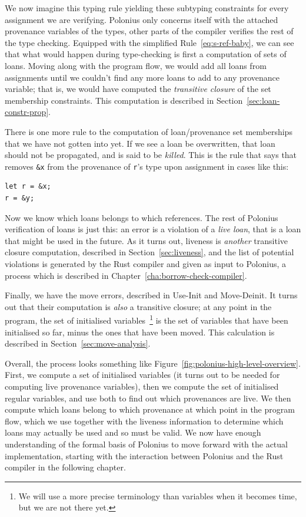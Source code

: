 \documentclass[11pt,a4paper,twoside,openany,draft]{report}
\newcommand{\InRust}[1]{\texttt{#1}}
\begin{document}
We now imagine this typing rule yielding these subtyping constraints for every
assignment we are verifying. Polonius only concerns itself with the attached
provenance variables of the types, other parts of the compiler verifies the rest
of the type checking. Equipped with the simplified Rule~\eqref{eq:s-ref-baby},
we can see that what would happen during type-checking is first a computation of
sets of loans. Moving along with the program flow, we would add all loans from
assignments until we couldn't find any more loans to add to any provenance
variable; that is, we would have computed the \textit{transitive closure} of the
set membership constraints. This computation is described in
Section~\ref{sec:loan-constr-prop}.

There is one more rule to the computation of loan/provenance set memberships
that we have not gotten into yet. If we see a loan be overwritten, that
loan should not be propagated, and is said to be \textit{killed}. This is the
rule that says that removes \InRust{&x} from the provenance of \InRust{r}'s type
upon assignment in cases like this:
\begin{verbatim}
let r = &x;
r = &y;
\end{verbatim}

Now we know which loans belongs to which references. The rest of Polonius
verification of loans is just this: an error is a violation of a \textit{live
  loan}, that is a loan that might be used in the future. As it turns out,
liveness is \textit{another} transitive closure computation, described in
Section~\ref{sec:liveness}, and the list of potential violations is generated by
the Rust compiler and given as input to Polonius, a process which is described
in Chapter~\ref{cha:borrow-check-compiler}.

Finally, we have the move errors, described in Use-Init and Move-Deinit. It
turns out that their computation is \textit{also} a transitive closure; at any
point in the program, the set of initialised variables~\footnote{We will use a
  more precise terminology than variables when it becomes time, but we are not
  there yet.} is the set of variables that have been initialised so far, minus
the ones that have been moved. This calculation is described in
Section~\ref{sec:move-analysis}.

Overall, the process looks something like
Figure~\ref{fig:polonius-high-level-overview}. First, we compute a set of
initialised variables (it turns out to be needed for computing live provenance
variables), then we compute the set of initialised regular variables, and use
both to find out which provenances are live. We then compute which loans belong
to which provenance at which point in the program flow, which we use together
with the liveness information to determine which loans may actually be used and
so must be valid. We now have enough understanding of the formal basis of
Polonius to move forward with the actual implementation, starting with the
interaction between Polonius and the Rust compiler in the following chapter.
\end{document}
